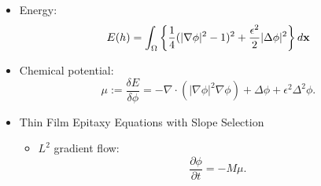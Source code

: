 \documentclass[amstex]{beamer}
\begin{document}
\begin{CJK*}{GBK}{kai}
\begin{frame}
\begin{itemize}
\item Energy:
\begin{equation*}
E(h) = \int_\Omega\left\{\frac{1}{4} (|\nabla \phi|^2-1)^2+      \frac{\epsilon^2}{2}|\Delta \phi|^2 \right\}d{\bf x}
\end{equation*} 
\item Chemical potential:
\begin{equation*}
\mu := \frac{\delta E}{\delta \phi}  =  - \nabla \cdot 
  \left( \left| \nabla \phi \right|^2 \nabla \phi \right) 
  +  \Delta \phi + \epsilon^2 \Delta^2 \phi.
\end{equation*}
\item Thin Film Epitaxy Equations with Slope Selection
\begin{itemize}
\item $L^2$ gradient flow:
\begin{equation*}
\frac{\partial \phi}{\partial t}=-M\mu.
\end{equation*}


\end{itemize}
\end{itemize}
\end{frame}
\end{CJK*}
\end{document}
